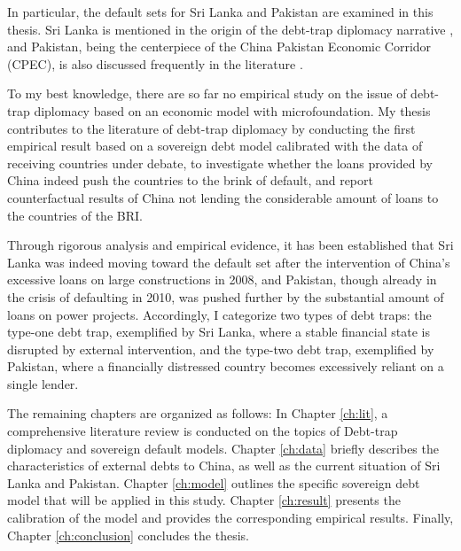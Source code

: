 In particular, the default sets for Sri Lanka and Pakistan are examined in this thesis. Sri Lanka is mentioned in the origin of the debt-trap diplomacy narrative \citep{Chellaney_2017}, and Pakistan, being the centerpiece of the China Pakistan Economic Corridor (CPEC), is also discussed frequently in the literature \citep{Hurley19-8-debt-trap}.

To my best knowledge, there are so far no empirical study on the issue of debt-trap diplomacy based on an economic model with microfoundation. My thesis contributes to the literature of debt-trap diplomacy by conducting the first empirical result based on a sovereign debt model calibrated with the data of receiving countries under debate, to investigate whether the loans provided by China indeed push the countries to the brink of default, and report counterfactual results of China not lending the considerable amount of loans to the countries of the BRI.

Through rigorous analysis and empirical evidence, it has been established that
Sri Lanka was indeed moving toward the default set after the intervention of China's excessive loans on large constructions in 2008, and Pakistan, though already in the crisis of defaulting in 2010, was pushed further by the substantial amount of loans on power projects.
Accordingly, I categorize two types of debt traps: the type-one debt trap, exemplified by Sri Lanka, where a stable financial state is disrupted by external intervention, and the type-two debt trap, exemplified by Pakistan, where a financially distressed country becomes excessively reliant on a single lender.

The remaining chapters are organized as follows:
In Chapter \ref{ch:lit}, a comprehensive literature review is conducted on the topics of Debt-trap diplomacy and sovereign default models.
Chapter \ref{ch:data} briefly describes the characteristics of external debts to China, as well as the current situation of Sri Lanka and Pakistan.
Chapter \ref{ch:model} outlines the specific sovereign debt model that will be applied in this study.
Chapter \ref{ch:result} presents the calibration of the model and provides the corresponding empirical results.
Finally, Chapter \ref{ch:conclusion} concludes the thesis.


